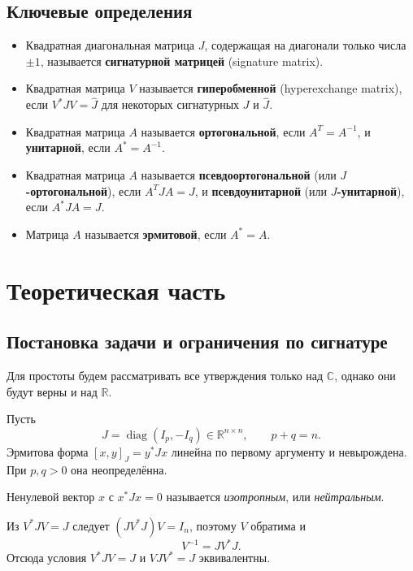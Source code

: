 \documentclass[a4paper,12pt]{article}
\DeclareMathOperator{\diag}{diag}
\theoremstyle{csstyle}
\newcommand{\R}{\mathbb R}
\newcommand{\HSVDComplex}{\mathbb C}
\begin{document}
\subsection*{Ключевые определения}

\begin{itemize}
    \item Квадратная диагональная матрица $J$, содержащая на диагонали только числа $\pm 1$, называется \textbf{сигнатурной матрицей} (signature matrix).
    \item Квадратная матрица $V$ называется \textbf{гиперобменной} (hyperexchange matrix), если $V^*JV = \hat{J}$ для некоторых сигнатурных $J$ и $\hat{J}$.
    \item Квадратная матрица $A$ называется \textbf{ортогональной}, если $A^T = A^{-1}$, и \textbf{унитарной}, если $A^* = A^{-1}$.
    \item Квадратная матрица $A$ называется \textbf{псевдоортогональной} (или \textbf{$J$-ортогональной}), если $A^TJA = J$, и \textbf{псевдоунитарной} (или \textbf{$J$-унитарной}), если $A^*JA = J$.
    \item Матрица $A$ называется \textbf{эрмитовой}, если $A^* = A$.
\end{itemize}


\endgroup


\section{Теоретическая часть}\label{sec:theory}\label{sec:cs-theory}
\subsection{Постановка задачи и ограничения по сигнатуре}\label{sec:structure}
Для простоты будем рассматривать все утверждения только над $\HSVDComplex$, однако они будут верны и над $\R$.

Пусть
\[
J=\diag(I_p,-I_q)\in\R^{n\times n},\qquad p+q=n.
\]
Эрмитова форма $[x,y]_J=y^*Jx$ линейна по первому аргументу и невырождена. При $p,q>0$ она неопределённа.

Ненулевой вектор $x$ с $x^*Jx=0$ называется
\emph{изотропным}, или \emph{нейтральным}.

Из $V^*JV=J$ следует $(JV^*J)V=I_n$, поэтому $V$ обратима и
\begin{equation}\label{eq:inverse}
V^{-1}=JV^*J.
\end{equation}
Отсюда условия $V^*JV=J$ и $VJV^*=J$ эквивалентны.
\end{document}
